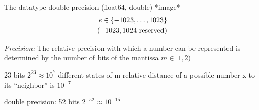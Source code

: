 The datatype double precision (float64, double)
*image*
\begin{align*}
    e \in \{ -1023, \ldots, 1023 \} \\
    (-1023, 1024 \hbox{ reserved})
\end{align*}

\emph{Precision:} The relative precision with which a number
can be represented is determined by the number of bits of the mantissa $m \in [1, 2 )$

23 bits \textrightarrow{} $2^{23} \approx 10^7$ different states of m \textrightarrow{} relative distance of a possible number x to its ``neighbor''  is $10^{-7}$


double precision: 52 bits \textrightarrow $2^{-52} \approx 10^{-15}$

